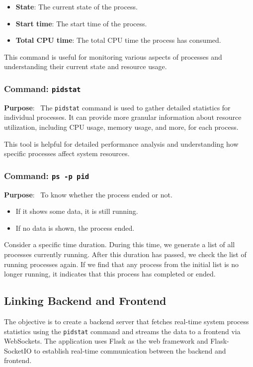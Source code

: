 \documentclass[12pt]{article}
\begin{document}
\begin{itemize}
    \item \textbf{State}: The current state of the process.
    \item \textbf{Start time}: The start time of the process.
    \item \textbf{Total CPU time}: The total CPU time the process has consumed.
\end{itemize}

This command is useful for monitoring various aspects of processes and understanding their current state and resource usage.

\subsubsection{Command: \texttt{pidstat}}

\textbf{Purpose}: \
The \texttt{pidstat} command is used to gather detailed statistics for individual processes. It can provide more granular information about resource utilization, including CPU usage, memory usage, and more, for each process.

This tool is helpful for detailed performance analysis and understanding how specific processes affect system resources.

\subsubsection{Command: \texttt{ps -p pid}}
\textbf{Purpose}: \
To know whether the process ended or not.
 \begin{itemize}
    \item If it shows some data, it is still running.
    \item If no data is shown, the process ended.
 \end{itemize}
Consider a specific time duration. During this time, we generate a list of all processes currently running. After this duration has passed, we check the list of running processes again. If we find that any process from the initial list is no longer running, it indicates that this process has completed or ended.

\subsection{Linking Backend and Frontend}
The objective is to create a backend server that fetches real-time system process statistics using the \texttt{pidstat} command and streams the data to a frontend via WebSockets. The application uses Flask as the web framework and Flask-SocketIO to establish real-time communication between the backend and frontend.
\end{document}
